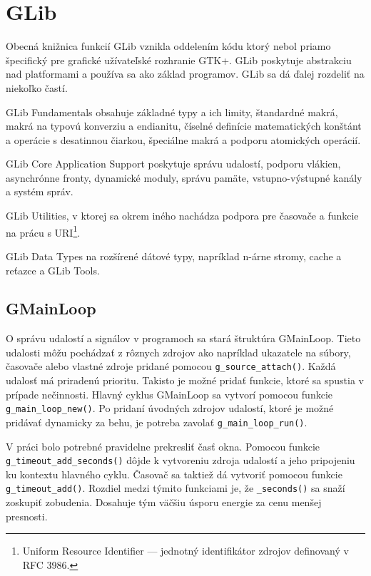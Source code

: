 \documentclass[12pt,oneside,final]{fithesis2}
\begin{document}
\section{GLib}
Obecná knižnica funkcií GLib vznikla oddelením kódu ktorý nebol priamo špecifický pre grafické užívateľské rozhranie GTK+. GLib poskytuje abstrakciu nad platformami a používa sa ako základ programov. GLib sa dá ďalej rozdeliť na niekoľko častí. 

GLib Fundamentals obsahuje základné typy a ich limity, štandardné makrá, makrá na typovú konverziu a endianitu, číselné definície matematických konštánt a operácie s desatinnou čiarkou, špeciálne makrá a podporu atomických operácií. 

GLib Core Application Support poskytuje správu udalostí, podporu vlákien, asynchrónne fronty, dynamické moduly, správu pamäte, vstupno-výstupné kanály a systém správ.
 
GLib Utilities, v ktorej sa okrem iného nachádza podpora pre časovače a funkcie na prácu s URI\footnote{Uniform Resource Identifier --- jednotný identifikátor zdrojov definovaný v RFC 3986.}.%

GLib Data Types na rozšírené dátové typy, napríklad n-árne stromy, cache a reťazce a GLib Tools.

\subsection{GMainLoop}O správu udalostí a signálov v programoch sa stará štruktúra GMainLoop. Tieto udalosti môžu pochádzať z rôznych zdrojov ako napríklad ukazatele na súbory, časovače alebo vlastné zdroje pridané pomocou \verb|g_source_attach()|. Každá udalosť má priradenú prioritu. Takisto je možné pridať funkcie, ktoré sa spustia v prípade nečinnosti. Hlavný cyklus GMainLoop sa vytvorí pomocou funkcie \verb|g_main_loop_new()|. Po pridaní úvodných zdrojov udalostí, ktoré je možné pridávať dynamicky za behu, je potreba zavolať \verb|g_main_loop_run()|.

V práci bolo potrebné pravidelne prekresliť časť okna. Pomocou funkcie \verb|g_timeout_add_seconds()| dôjde k vytvoreniu zdroja udalostí a jeho pripojeniu ku kontextu hlavného cyklu. Časovač sa taktiež dá vytvoriť pomocou funkcie \verb|g_timeout_add()|. Rozdiel medzi týmito funkciami je, že \verb|_seconds()| sa snaží zoskupiť zobudenia. Dosahuje tým väčšiu úsporu energie za cenu menšej presnosti.
\end{document}
